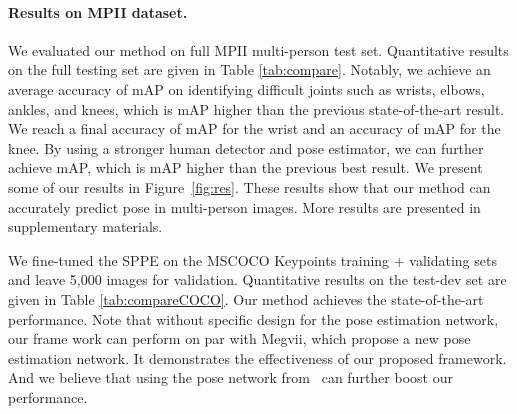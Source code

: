 \documentclass[10pt,twocolumn,letterpaper]{article}
\begin{document}
\paragraph{Results on MPII dataset.} We evaluated our method on full MPII multi-person test set. Quantitative results on the full testing set are given in Table \ref{tab:compare}.
Notably, we achieve an average accuracy of  mAP on identifying difficult joints such as wrists, elbows, ankles, and knees, which is  mAP higher than the previous  state-of-the-art result. We reach a final accuracy of  mAP for the wrist and an accuracy of  mAP for the knee. By using a stronger human detector and pose estimator, we can further achieve  mAP, which is  mAP higher than the previous best result. We present some of our results in Figure~\ref{fig:res}. These results show that our method can accurately predict pose in multi-person images. More results are presented in supplementary materials.



\vspace{2mm}
 We fine-tuned the SPPE on the MSCOCO Keypoints training + validating sets and leave 5,000 images for validation. Quantitative results on the test-dev set are given in Table \ref{tab:compareCOCO}. Our method achieves the state-of-the-art performance. Note that without specific design for the pose estimation network, our frame work can perform on par with Megvii\cite{chen2017cascaded}, which propose a new pose estimation network. It demonstrates the effectiveness of our proposed framework. And we believe that using the pose network from~\cite{chen2017cascaded} can further boost our performance.
{\small
\begin{table}[tbh]
\begin{center}
\vspace{0.10in}
\caption{Results on the MSCOCO Keypoint Challenge (AP) dataset \cite{MSCOCO}. The MSCOCO website provides a technical overview only. Our result is obtained without ensembling. ``++'' denotes using faster-rcnn with softnms~\cite{bodla2017soft} as human detector, PyraNet~\cite{yang2017learning} with input size 320x256 as pose estimator. We only compare to single model results.} \label{tab:compareCOCO}
\end{center}
\end{table}
}
\end{document}
